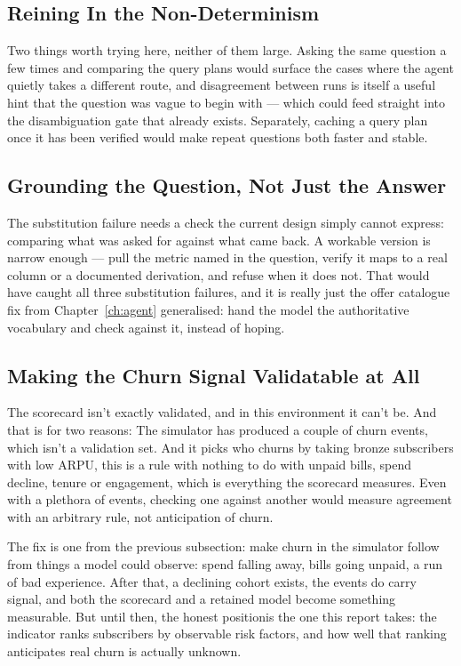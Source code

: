 \subsection{Reining In the Non-Determinism}

Two things worth trying here, neither of them large. Asking the same question a
few times and comparing the query plans would surface the cases where the agent
quietly takes a different route, and disagreement between runs is itself a
useful hint that the question was vague to begin with --- which could feed
straight into the disambiguation gate that already exists. Separately, caching a
query plan once it has been verified would make repeat questions both faster and
stable.

\subsection{Grounding the Question, Not Just the Answer}

The substitution failure needs a check the current design simply cannot express:
comparing what was asked for against what came back. A workable version is
narrow enough --- pull the metric named in the question, verify it maps to a
real column or a documented derivation, and refuse when it does not. That would
have caught all three substitution failures, and it is really just the offer
catalogue fix from Chapter~\ref{ch:agent} generalised: hand the model the
authoritative vocabulary and check against it, instead of hoping.

\subsection{Making the Churn Signal Validatable at All}
The scorecard isn't exactly validated, and in this environment it can't be. And that is for 
two reasons: The simulator has produced a couple of churn events, which isn't a validation set. 
And it picks who churns by taking bronze subscribers with low ARPU, this is a rule with nothing 
to do with unpaid bills, spend decline, tenure or engagement, which is everything the scorecard 
measures. Even with a plethora of events, checking one against another would measure agreement with 
an arbitrary rule, not anticipation of churn. 

The fix is one from the previous subsection: make churn in the simulator follow from things a model could 
observe: spend falling away, bills going unpaid, a run of bad experience. After that, a declining cohort exists, 
the events do carry signal, and both the scorecard and a retained model become something measurable. But until then, the honest positionis the one this report takes: the indicator ranks subscribers by 
observable risk factors, and how well that ranking anticipates real churn is actually unknown.


